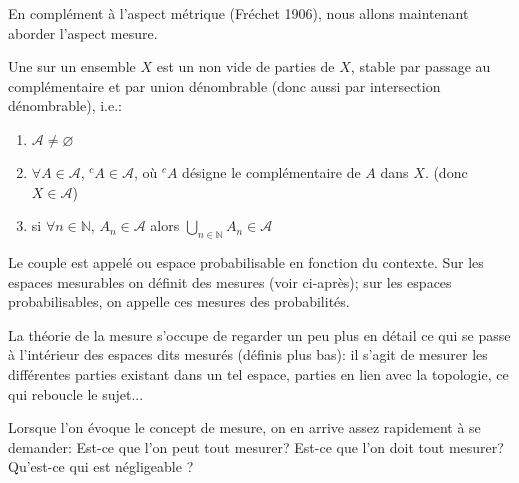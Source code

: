 En complément à l'aspect métrique (Fréchet 1906), nous
allons maintenant aborder l'aspect mesure.

\medskip
\begin{definition}[Tribu]
Une  sur un ensemble $X$ est un 
non vide de parties de $X$,  stable par passage au complémentaire et par union dénombrable
(donc aussi par intersection  dénombrable), i.e.:
\begin{enumerate}
 \item $\mathcal{A} \not=\varnothing$
 \item $\forall A \in \mathcal{A}$, ${}^c A \in\mathcal{A}$, où ${}^cA$ désigne le complémentaire de $A$ dans $X$.
	(donc $X\in \mathcal{A}$)
\item si $\forall n \in \mathbb{N}$, $A_n \in\mathcal{A}$ alors $\bigcup_{n\in\mathbb{N} } A_n \in\mathcal{A}$
\end{enumerate}
\end{definition}

\begin{definition}
Le couple  est appelé  ou espace probabilisable en fonction du contexte.
Sur les espaces mesurables on définit des mesures (voir ci-après); sur les espaces probabilisables, on
appelle ces mesures des probabilités.
\end{definition}

\begin{histoire}
La théorie de la mesure s'occupe de regarder un peu plus en détail ce qui se
passe à l'intérieur des espaces dits mesurés (définis plus bas): il s'agit
de mesurer les différentes parties existant dans un tel espace, parties en lien
avec la topologie, ce qui reboucle le sujet...

\medskip
Lorsque l'on évoque le concept de mesure, on en arrive assez rapidement
à se demander: Est-ce que l'on peut tout mesurer? Est-ce
que l'on doit tout mesurer? Qu'est-ce qui est négligeable ?

\medskip
{}
\end{histoire}

